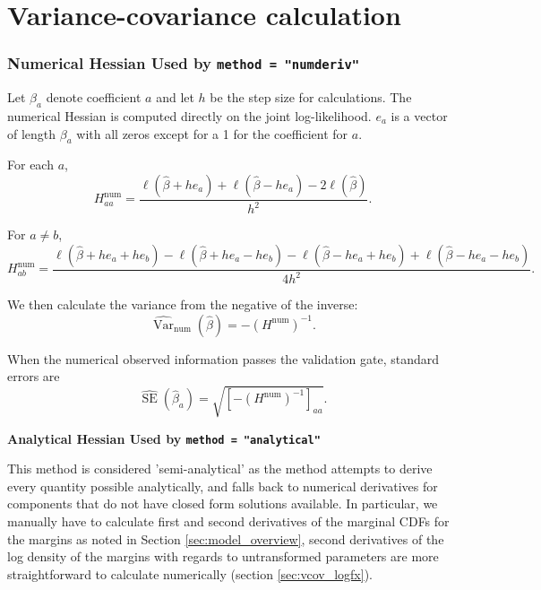 \documentclass{article}
\begin{document}
\section{Variance-covariance calculation}
\subsubsection{Numerical Hessian Used by \texttt{method = "numderiv"}}

Let $\beta_a$ denote coefficient $a$ and let $h$ be the step size for calculations. The numerical Hessian is computed directly on the joint log-likelihood. $e_a$ is a vector of length $\beta_a$ with all zeros except for a 1 for the coefficient for $a$.

For each $a$,
\begin{equation*}
H_{aa}^{\text{num}} =
\frac{\ell(\hat{\beta}+h e_a) + \ell(\hat{\beta}-h e_a) - 2\ell(\hat{\beta})}{h^2}.
\end{equation*}

For $a \neq b$,
\begin{equation*}
H_{ab}^{\text{num}} =
\frac{
\ell(\hat{\beta}+he_a+he_b)
- \ell(\hat{\beta}+he_a-he_b)
- \ell(\hat{\beta}-he_a+he_b)
+ \ell(\hat{\beta}-he_a-he_b)
}{4h^2}.
\end{equation*}

We then calculate the variance from the negative of the inverse:
\begin{equation*}
\widehat{\operatorname{Var}}_{\text{num}}(\hat{\beta}) = -\left(H^{\text{num}}\right)^{-1}.
\end{equation*}

When the numerical observed information passes the validation gate, standard
errors are
\begin{equation*}
\widehat{\operatorname{SE}}(\hat{\beta}_a) =
\sqrt{\left[-\left(H^{\text{num}}\right)^{-1}\right]_{aa}}.
\end{equation*}

\textbf{Analytical Hessian Used by \texttt{method = "analytical"}}

This method is considered 'semi-analytical' as the method attempts to derive every quantity possible analytically, and falls back to numerical derivatives for components that do not have closed form solutions available. In particular, we manually have to calculate first and second derivatives of the marginal CDFs for the margins as noted in Section \ref{sec:model_overview}, second derivatives of the log density of the margins with regards to untransformed parameters are more straightforward to calculate numerically (section \ref{sec:vcov_logfx}).
\end{document}
